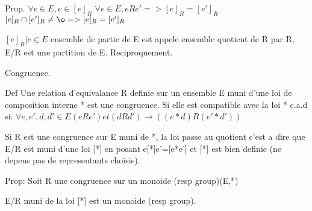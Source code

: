 \documentclass{article}
\begin{document}
Prop.
$ \forall e \in E, e \in [e]_R $
$ \forall e \in E, eRe' => [e]_R = [e']_R$
$ [e]_R \cap [e']_R \ne \o => [e]_R= [e']_R $

$ {[e]_R | e \in E} $ ensemble de partie de E est appele ensemble quotient de R par R, E/R est une partition de E.
Reciproquement.


Congruence.

Def Une relation d'equivalance R definie sur un ensemble E muni d'une loi de composition interne * est une congruence.
Si elle est compatible avec la loi *
c.a.d si:
$ \forall e, e', d, d' \in E (eRe') et (dRd') \rightarrow ((e*d)R(e'*d'))$

Si R est une congruence sur E muni de *, la loi passe au quotient c'est a dire que E/R est muni d'une loi [*]
en posant e[*]e'=[e*e'] et [*] est bien definie (ne depens pas de representants choisis).


Prop: Soit R une congruence sur un monoide (resp group)(E,*)

E/R muni de la loi [*] est un monoide (resp group).
\end{document}
